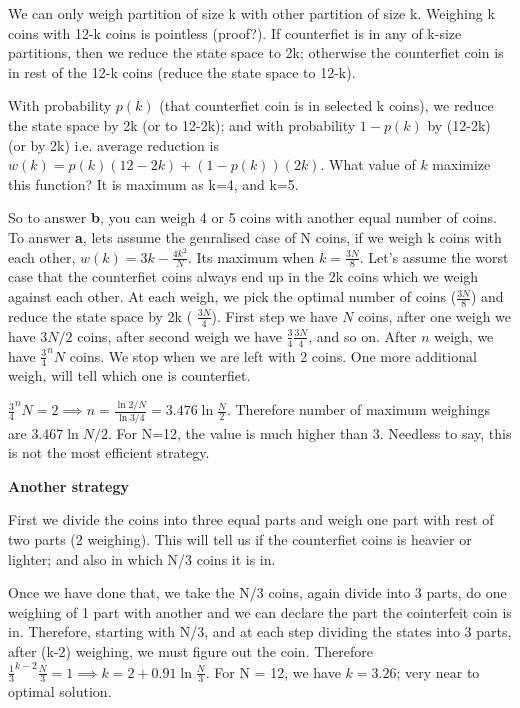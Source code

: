 \documentclass[10pt,answers]{exam}
\begin{document}
\begin{questions}
We can only weigh partition of size k with other partition of size k.
Weighing k coins with 12-k coins is pointless (proof?). If counterfiet
is in any of k-size partitions, then we reduce the state space to 2k;
otherwise the counterfiet coin is in rest of the 12-k coins (reduce the
state space to 12-k).

With probability \(p(k)\) (that counterfiet coin is in selected k
coins), we reduce the state space by 2k (or to 12-2k); and with
probability \(1-p(k)\) by (12-2k) (or by 2k) i.e. average reduction is
\(w(k)=p(k)(12-2k)+(1-p(k))(2k)\). What value of \(k\) maximize this
function? It is maximum as k=4, and k=5.


So to answer \textbf{b}, you can weigh 4 or 5 coins with another equal
number of coins. To answer \textbf{a}, lets assume the genralised case
of N coins, if we weigh k coins with each other,
\(w(k) = 3k - \frac{4k^2}{N}\). Its maximum when \(k = \frac{3N}{8}\).
Let's assume the worst case that the counterfiet coins always end up in
the 2k coins which we weigh against each other. At each weigh, we pick
the optimal number of coins (\(\frac{3N}{8}\)) and reduce the state
space by 2k ( \(\frac{3N}{4}\)). First step we have \(N\) coins, after
one weigh we have \(3N/2\) coins, after second weigh we have
\(\frac{3}{4}\frac{3N}{4}\), and so on. After \(n\) weigh, we have
\(\frac{3}{4}^n N\) coins. We stop when we are left with 2 coins. One
more additional weigh, will tell which one is counterfiet.

\(\frac{3}{4}^n N = 2 \implies n = \frac{\ln{2/N}}{\ln{3/4}} = 3.476 \ln{\frac{N}{2}}\).
Therefore number of maximum weighings are \(3.467\ln{N/2}\). For N=12,
the value is much higher than 3. Needless to say, this is not the most
efficient strategy.

\textbf{Another strategy}

First we divide the coins into three equal parts and weigh one part with
rest of two parts (2 weighing). This will tell us if the counterfiet
coins is heavier or lighter; and also in which N/3 coins it is in.

Once we have done that, we take the N/3 coins, again divide into 3
parts, do one weighing of 1 part with another and we can declare the
part the cointerfeit coin is in. Therefore, starting with N/3, and at
each step dividing the states into 3 parts, after (k-2) weighing, we
must figure out the coin. Therefore
\(\frac{1}{3}^{k-2} \frac{N}{3} = 1 \implies k = 2 + 0.91 \ln \frac{N}{3}\).
For N = 12, we have \(k = 3.26\); very near to optimal solution.

\end{questions}
\end{document}
